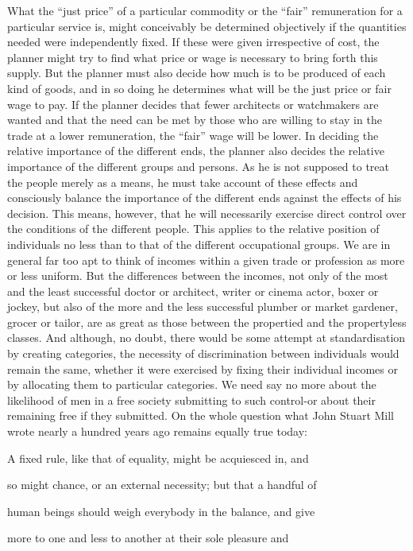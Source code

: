 \documentclass[11pt,openany]{book}
\begin{document}
What the ``just price'' of a particular commodity or the ``fair'' remuneration for a particular service is, might conceivably be determined objectively if the quantities needed were independently fixed. If these were given irrespective of cost, the planner might try to find what price or wage is necessary to bring forth this supply. But the planner must also decide how much is to be produced of each kind of goods, and in so doing he determines what will be the just price or fair wage to pay. If the planner decides that fewer architects or watchmakers are wanted and that the need can be met by those who are willing to stay in the trade at a lower remuneration, the ``fair'' wage will be lower. In deciding the relative importance of the different ends, the planner also decides the relative importance of the different groups and persons. As he is not supposed to treat the people merely as a means, he must take account of these effects and consciously balance the importance of the different ends against the effects of his decision. This means, however, that he will necessarily exercise direct control over the conditions of the different people. This applies to the relative position of individuals no less than to that of the different occupational groups. We are in general far too apt to think of incomes within a given trade or profession as more or less uniform. But the differences between the incomes, not only of the most and the least successful doctor or architect, writer or cinema actor, boxer or jockey, but also of the more and the less successful plumber or market gardener, grocer or tailor, are as great as those between the propertied and the propertyless classes. And although, no doubt, there would be some attempt at standardisation by creating categories, the necessity of discrimination between individuals would remain the same, whether it were exercised by fixing their individual incomes or by allocating them to particular categories. We need say no more about the likelihood of men in a free society submitting to such control-or about their remaining free if they submitted. On the whole question what John Stuart Mill wrote nearly a hundred years ago remains equally true today:

A fixed rule, like that of equality, might be acquiesced in, and

so might chance, or an external necessity; but that a handful of

human beings should weigh everybody in the balance, and give

more to one and less to another at their sole pleasure and
\end{document}
